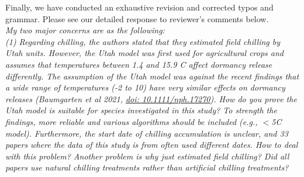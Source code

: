 \documentclass[11pt]{article}
\begin{document}
Finally, we have conducted an exhaustive revision and corrected typos and grammar. Please see our detailed response to reviewer's comments below. \\


\emph{My two major concerns are as the following:}\\
\emph{(1) Regarding chilling, the authors stated that they estimated field chilling by Utah units. However, the Utah model was first used for agricultural crops and assumes that temperatures between 1.4 and 15.9 \degree C affect dormancy release differently. The assumption of the Utah model was against the recent findings that a wide range of temperatures (-2 to 10\degreeC) have very similar effects on dormancy releases (Baumgarten et al 2021, \url{doi: 10.1111/nph.17270}). How do you prove the Utah model is suitable for species investigated in this study? To strength the findings, more reliable and various algorithms should be included (e.g., $<$5\degree C model). Furthermore, the start date of chilling accumulation is unclear, and 33 papers where the data of this study is from often used different dates. How to deal with this problem? Another problem is why just estimated field chilling? Did all papers use natural chilling treatments rather than artificial chilling treatments?}\\
\end{document}
